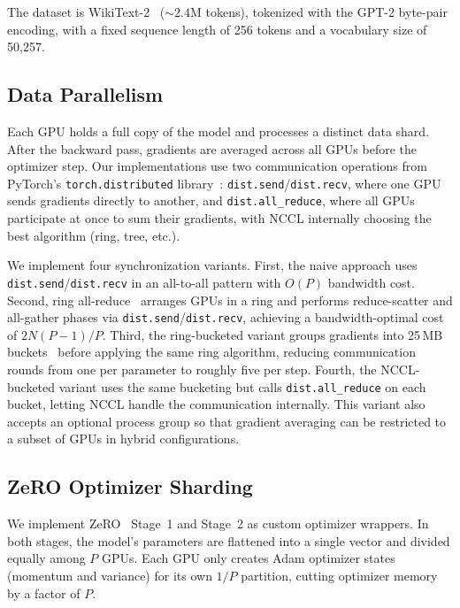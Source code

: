 \documentclass[conference]{IEEEtran}
\begin{document}
The dataset is WikiText-2~\cite{merity2016pointer} (${\sim}2.4$M tokens), tokenized with the GPT-2 byte-pair encoding, with a fixed sequence length of 256 tokens and a vocabulary size of 50,257.

\subsection{Data Parallelism}

Each GPU holds a full copy of the model and processes a distinct data shard. After the backward pass, gradients are averaged across all GPUs before the optimizer step. Our implementations use two communication operations from PyTorch's \texttt{torch.distributed} library~\cite{li2020pytorch}: \texttt{dist.send}/\texttt{dist.recv}, where one GPU sends gradients directly to another, and \texttt{dist.all\_reduce}, where all GPUs participate at once to sum their gradients, with NCCL internally choosing the best algorithm (ring, tree, etc.).

We implement four synchronization variants. First, the naive approach uses \texttt{dist.send}/\texttt{dist.recv} in an all-to-all pattern with $O(P)$ bandwidth cost. Second, ring all-reduce~\cite{patarasuk2009bandwidth} arranges GPUs in a ring and performs reduce-scatter and all-gather phases via \texttt{dist.send}/\texttt{dist.recv}, achieving a bandwidth-optimal cost of $2N(P{-}1)/P$. Third, the ring-bucketed variant groups gradients into 25\,MB buckets~\cite{li2020pytorch} before applying the same ring algorithm, reducing communication rounds from one per parameter to roughly five per step. Fourth, the NCCL-bucketed variant uses the same bucketing but calls \texttt{dist.all\_reduce} on each bucket, letting NCCL handle the communication internally. This variant also accepts an optional process group so that gradient averaging can be restricted to a subset of GPUs in hybrid configurations.

\subsection{ZeRO Optimizer Sharding}

We implement ZeRO~\cite{rajbhandari2019zero} Stage~1 and Stage~2 as custom optimizer wrappers. In both stages, the model's parameters are flattened into a single vector and divided equally among $P$ GPUs. Each GPU only creates Adam optimizer states (momentum and variance) for its own $1/P$ partition, cutting optimizer memory by a factor of $P$.
\end{document}
